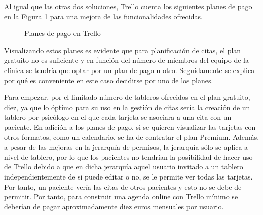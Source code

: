 Al igual que las otras dos soluciones, Trello cuenta los siguientes planes de pago en la Figura \ref{fig:trello-precios} para una mejora de las funcionalidades ofrecidas. 

\begin{figure}[H]
    \caption{Planes de pago en Trello}
    \label{fig:trello-precios}
\end{figure}

Visualizando estos planes es evidente que para planificación de citas, el plan gratuito no es suficiente y en función del número de miembros del equipo de la clínica se tendría que optar por un plan de pago u otro. Seguidamente se explica por qué es conveniente en este caso decidirse por uno de los planes. \bigskip

Para empezar, por el limitado número de tableros ofrecidos en el plan gratuito, diez, ya que lo óptimo para su uso en la gestión de citas sería la creación de un tablero por psicólogo en el que cada tarjeta se asociara a una cita con un paciente. En adición a los planes de pago, si se quieren visualizar las tarjetas con otros formatos, como un calendario, se ha de contratar el plan Premium. Además, a pesar de las mejoras en la jerarquía de permisos, la jerarquía sólo se aplica a nivel de tablero, por lo que los pacientes no tendrían la posibilidad de hacer uso de Trello debido a que en dicha jerarquía aquel usuario invitado a un tablero independientemente de si puede editar o no, se le permite ver todas las tarjetas. Por tanto, un paciente vería las citas de otros pacientes y esto no se debe de permitir. Por tanto, para construir una agenda online con Trello mínimo se deberían de pagar aproximadamente diez euros mensuales por usuario. \bigskip

